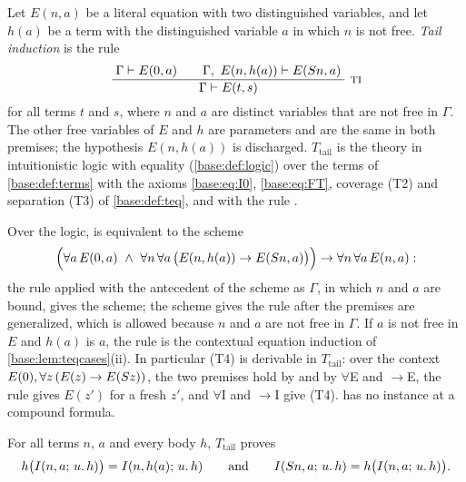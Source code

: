 \begin{definition}
\label{base:def:tail}
Let $E(n,a)$ be a literal equation with two distinguished variables, and
let $h(a)$ be a term with the distinguished variable $a$ in which $n$ is
not free.  \emph{Tail induction} is the rule
\[
 \infrule{\Gamma\proves E(0,a)\qquad\Gamma,\ E(n,h(a))\proves E(\Suc n,a)}
         {\Gamma\proves E(t,s)}\ \rulename{TI}
\]
for all terms $t$ and $s$, where $n$ and $a$ are distinct variables that
are not free in $\Gamma$.  The other free variables of $E$ and $h$ are
parameters and are the same in both premises; the hypothesis
$E(n,h(a))$ is discharged.  $T_{\mathrm{tail}}$ is the theory in
intuitionistic logic with equality (\cref{base:def:logic}) over the terms of
\cref{base:def:terms} with the axioms \eqref{base:eq:I0},
\eqref{base:eq:FT}, coverage (T2) and separation (T3) of
\cref{base:def:teq}, and with the rule .
\end{definition}

Over the logic,  is equivalent to the scheme
\[
 \Bigl(\forall a\,E(0,a)\ \wedge\ \forall n\,\forall a\,
   \bigl(E(n,h(a))\to E(S n,a)\bigr)\Bigr)\to\forall n\,\forall a\,E(n,a):
\]
the rule applied with the antecedent of the scheme as $\Gamma$, in which
$n$ and $a$ are bound, gives the scheme; the scheme gives the rule after
the premises are generalized, which is allowed because $n$ and $a$ are not
free in $\Gamma$.  If $a$ is not free in $E$ and $h(a)$ is $a$, the rule is
the contextual equation induction of \cref{base:lem:teqcases}(ii).  In
particular (T4) is derivable in $T_{\mathrm{tail}}$: over the context
$E(0),\forall z\,(E(z)\to E(S z))$, the two premises hold by
 and by $\forall$E and $\to$E, the rule gives $E(z')$ for a
fresh $z'$, and $\forall$I and $\to$I give (T4).   has no
instance at a compound formula.

\begin{proposition}
\label{base:prop:tail-back}
For all terms $n$, $a$ and every body $h$, $T_{\mathrm{tail}}$ proves
\[
 h\bigl(I(n,a;\,u.\,h)\bigr)=I(n,h(a);\,u.\,h)
 \qquad\text{and}\qquad
 I(S n,a;\,u.\,h)=h\bigl(I(n,a;\,u.\,h)\bigr).
\]
\end{proposition}

